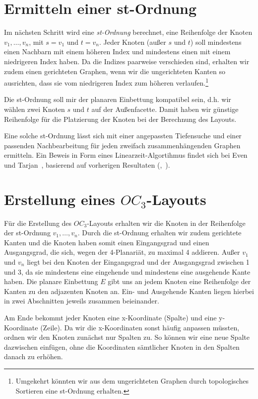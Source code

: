 \documentclass[a4paper]{scrreprt}
\theoremstyle{definition}
\begin{document}
\section{Ermitteln einer st-Ordnung}

Im nächsten Schritt wird eine \emph{st-Ordnung} berechnet, eine Reihenfolge der Knoten $v_1, \dots, v_n$, mit $s=v_1$ und $t=v_n$. Jeder Knoten (außer $s$ und $t$) soll mindestens einen Nachbarn mit einem höheren Index und mindestens einen mit einem niedrigeren Index haben. Da die Indizes paarweise verschieden sind, erhalten wir zudem einen gerichteten Graphen, wenn wir die ungerichteten Kanten so ausrichten, dass sie vom niedrigeren Index zum höheren verlaufen.\footnote {Umgekehrt könnten wir aus dem ungerichteten Graphen durch topologisches Sortieren eine st-Ordnung erhalten.}

Die st-Ordnung soll mir der planaren Einbettung kompatibel sein, d.h. wir wählen zwei Knoten $s$ und $t$ auf der Außenfacette. Damit haben wir günstige Reihenfolge für die Platzierung der Knoten bei der Berechnung des Layouts. 

Eine solche st-Ordnung lässt sich mit einer angepassten Tiefensuche und einer passenden Nachbearbeitung für jeden zweifach zusammenhängenden Graphen ermitteln. Ein Beweis in Form eines Linearzeit-Algortihmus findet sich bei Even und Tarjan~\cite{even+tarjan-75}, basierend auf vorherigen Resultaten (\cite{hopcroft+tarjan-74},~\cite{tarjan-72}).

\section{Erstellung eines $OC_3$-Layouts}

Für die Erstellung des $OC_3$-Layouts erhalten wir die Knoten in der Reihenfolge der st-Ordnung $v_1, \dots, v_n$. Durch die st-Ordnung erhalten wir zudem gerichtete Kanten und die Knoten haben somit einen Eingangsgrad und einen Ausgangsgrad, die sich, wegen der 4-Planariät, zu maximal 4 addieren. Außer $v_1$ und $v_n$ liegt bei den Knoten der Eingangsgrad und der Ausgangsgrad zwischen 1 und 3, da sie mindestens eine eingehende und mindestens eine ausgehende Kante haben. Die planare Einbettung $E$ gibt uns an jedem Knoten eine Reihenfolge der Kanten zu den adjazenten Knoten an. Ein- und Ausgehende Kanten liegen hierbei in zwei Abschnitten jeweils zusammen beieinander.

Am Ende bekommt jeder Knoten eine x-Koordinate (Spalte) und eine y-Koordinate (Zeile). Da wir die x-Koordinaten sonst häufig anpassen müssten, ordnen wir den Knoten zunächst nur Spalten zu. So können wir eine neue Spalte dazwischen einfügen, ohne die Koordinaten sämtlicher Knoten in den Spalten danach zu erhöhen. 
\end{document}
